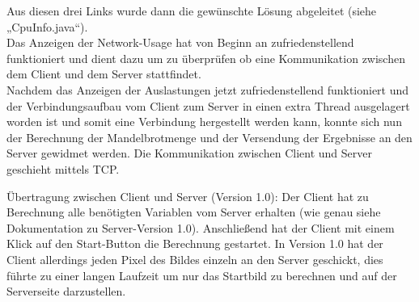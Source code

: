 \documentclass[12pt, onecolumn,notitlepage]{scrartcl}
\begin{document}
Aus diesen drei Links wurde dann die gewünschte Lösung abgeleitet (siehe „CpuInfo.java“).\\
Das Anzeigen der Network-Usage hat von Beginn an zufriedenstellend funktioniert und dient dazu um zu überprüfen ob eine Kommunikation zwischen dem Client und dem Server stattfindet.\\
Nachdem das Anzeigen der Auslastungen jetzt zufriedenstellend funktioniert und der Verbindungsaufbau vom Client zum Server in einen extra Thread ausgelagert worden ist und somit eine Verbindung hergestellt werden kann, konnte sich nun der Berechnung der Mandelbrotmenge und der Versendung der Ergebnisse an den Server gewidmet werden. Die Kommunikation zwischen Client und Server geschieht mittels TCP. \par
Übertragung zwischen Client und Server (Version 1.0): 
Der Client hat zu Berechnung alle benötigten Variablen vom Server erhalten (wie genau siehe Dokumentation zu Server-Version 1.0). Anschließend hat der Client mit einem Klick auf den Start-Button die Berechnung gestartet. In Version 1.0 hat der Client allerdings jeden Pixel des Bildes einzeln an den Server geschickt, dies führte zu einer langen Laufzeit um nur das Startbild zu berechnen und auf der Serverseite darzustellen.\par
\end{document}
